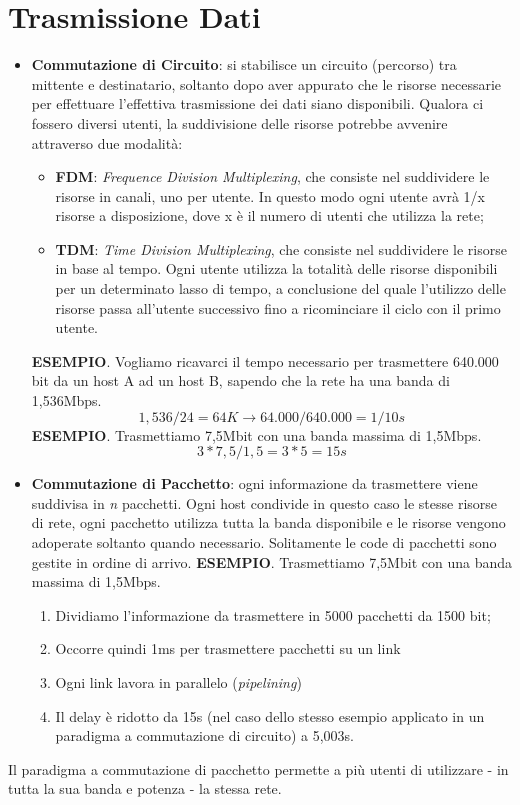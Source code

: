 \section{Trasmissione Dati}
\begin{itemize}
    \item \textbf{Commutazione di Circuito}: si stabilisce un circuito (percorso) tra mittente e destinatario, soltanto dopo aver appurato che le risorse necessarie per effettuare l'effettiva trasmissione dei dati siano disponibili.
    Qualora ci fossero diversi utenti, la suddivisione delle risorse potrebbe avvenire attraverso due modalità:
    \begin{itemize}
        \item \textbf{FDM}: \textit{Frequence Division Multiplexing}, che consiste nel suddividere le risorse in canali, uno per utente. In questo modo ogni utente avrà 1/x risorse a disposizione, dove x è il numero di utenti che utilizza la rete;
        \item \textbf{TDM}: \textit{Time Division Multiplexing}, che consiste nel suddividere le risorse in base al tempo. Ogni utente utilizza la totalità delle risorse disponibili per un determinato lasso di tempo, a conclusione del quale l'utilizzo delle risorse passa all'utente successivo fino a ricominciare il ciclo con il primo utente.
    \end{itemize}
    \textbf{ESEMPIO}. Vogliamo ricavarci il tempo necessario per trasmettere 640.000 bit da un host A ad un host B, sapendo che la rete ha una banda di 1,536Mbps.
    \begin{equation}
        1,536/24 = 64K \to 64.000/640.000 = 1/10s
    \end{equation}
    \textbf{ESEMPIO}. Trasmettiamo 7,5Mbit con una banda massima di 1,5Mbps.
    \begin{equation}
        3*7,5/1,5 = 3*5 = 15s
    \end{equation}
    
    \item \textbf{Commutazione di Pacchetto}: ogni informazione da trasmettere viene suddivisa in \textit{n} pacchetti. Ogni host condivide in questo caso le stesse risorse di rete, ogni pacchetto utilizza tutta la banda disponibile e le risorse vengono adoperate soltanto quando necessario.
    Solitamente le code di pacchetti sono gestite in ordine di arrivo.
    \textbf{ESEMPIO}. Trasmettiamo 7,5Mbit con una banda massima di 1,5Mbps.
    \begin{enumerate}
        \item Dividiamo l'informazione da trasmettere in 5000 pacchetti da 1500 bit;
        \item Occorre quindi 1ms per trasmettere pacchetti su un link
        \item Ogni link lavora in parallelo (\textit{pipelining})
        \item Il delay è ridotto da 15s (nel caso dello stesso esempio applicato in un paradigma a commutazione di circuito) a 5,003s.
    \end{enumerate}
\end{itemize}
Il paradigma a commutazione di pacchetto permette a più utenti di utilizzare - in tutta la sua banda e potenza - la stessa rete.

